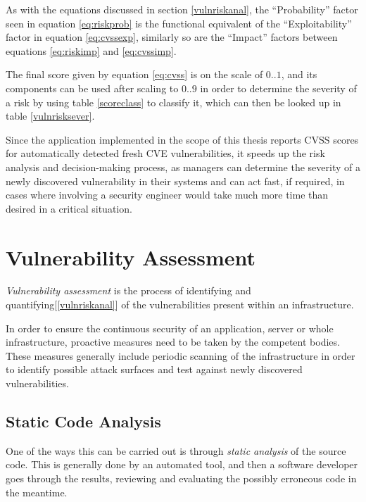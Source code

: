 \documentclass[a4paper,12pt]{article}
\begin{document}
	As with the equations discussed in section \ref{vulnriskanal}, the ``Probability'' factor seen in equation \ref{eq:riskprob} is the functional equivalent of the ``Exploitability'' factor in equation \ref{eq:cvssexp}, similarly so are the ``Impact'' factors between equations \ref{eq:riskimp} and \ref{eq:cvssimp}.
	
	The final score given by equation \ref{eq:cvss} is on the scale of $0..1$, and its components can be used after scaling to $0..9$ in order to determine the severity of a risk by using table \ref{scoreclass} to classify it, which can then be looked up in table \ref{vulnrisksever}.
	
	Since the application implemented in the scope of this thesis reports CVSS scores for automatically detected fresh CVE vulnerabilities, it speeds up the risk analysis and decision-making process, as managers can determine the severity of a newly discovered vulnerability in their systems and can act fast, if required, in cases where involving a security engineer would take much more time than desired in a critical situation.
	
\section{Vulnerability Assessment}
 
	
	\textit{Vulnerability assessment} is the process of identifying and quantifying[\ref{vulnriskanal}] of the vulnerabilities present within an infrastructure.
	
	In order to ensure the continuous security of an application, server or whole infrastructure, proactive measures need to be taken by the competent bodies. These measures generally include periodic scanning of the infrastructure in order to identify possible attack surfaces and test against newly discovered vulnerabilities.
	
\subsection{Static Code Analysis}
 
	
	One of the ways this can be carried out is through \textit{static analysis} of the source code. This is generally done by an automated tool, and then a software developer goes through the results, reviewing and evaluating the possibly erroneous code in the meantime.
	
\end{document}
